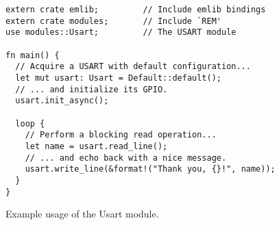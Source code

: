 \begin{listing}[H]
  \begin{verbatim}
extern crate emlib;         // Include emlib bindings
extern crate modules;       // Include `REM'
use modules::Usart;         // The USART module

fn main() {
  // Acquire a USART with default configuration...
  let mut usart: Usart = Default::default();
  // ... and initialize its GPIO.
  usart.init_async();

  loop {
    // Perform a blocking read operation...
    let name = usart.read_line();
    // ... and echo back with a nice message.
    usart.write_line(&format!("Thank you, {}!", name));
  }
}
  \end{verbatim}
  \caption{Example usage of the Usart module.}
  \label{lst:usart_abstraction}
\end{listing}
